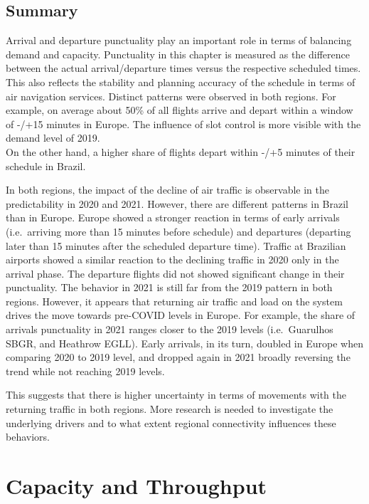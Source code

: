 \documentclass[
  a4paper,
  DIV=11,
  numbers=noendperiod]{scrreprt}
\begin{document}
\hypertarget{summary-2}{%
\section{Summary}\label{summary-2}}

Arrival and departure punctuality play an important role in terms of
balancing demand and capacity. Punctuality in this chapter is measured
as the difference between the actual arrival/departure times versus the
respective scheduled times. This also reflects the stability and
planning accuracy of the schedule in terms of air navigation services.
Distinct patterns were observed in both regions. For example, on average
about 50\% of all flights arrive and depart within a window of -/+15
minutes in Europe. The influence of slot control is more visible with
the demand level of 2019.\\
On the other hand, a higher share of flights depart within -/+5 minutes
of their schedule in Brazil.

In both regions, the impact of the decline of air traffic is observable
in the predictability in 2020 and 2021. However, there are different
patterns in Brazil than in Europe. Europe showed a stronger reaction in
terms of early arrivals (i.e.~arriving more than 15 minutes before
schedule) and departures (departing later than 15 minutes after the
scheduled departure time). Traffic at Brazilian airports showed a
similar reaction to the declining traffic in 2020 only in the arrival
phase. The departure flights did not showed significant change in their
punctuality. The behavior in 2021 is still far from the 2019 pattern in
both regions. However, it appears that returning air traffic and load on
the system drives the move towards pre-COVID levels in Europe. For
example, the share of arrivals punctuality in 2021 ranges closer to the
2019 levels (i.e.~Guarulhos SBGR, and Heathrow EGLL). Early arrivals, in
its turn, doubled in Europe when comparing 2020 to 2019 level, and
dropped again in 2021 broadly reversing the trend while not reaching
2019 levels.

This suggests that there is higher uncertainty in terms of movements
with the returning traffic in both regions. More research is needed to
investigate the underlying drivers and to what extent regional
connectivity influences these behaviors.


\hypertarget{capacity-and-throughput}{%
\chapter{Capacity and Throughput}\label{capacity-and-throughput}}
\end{document}

